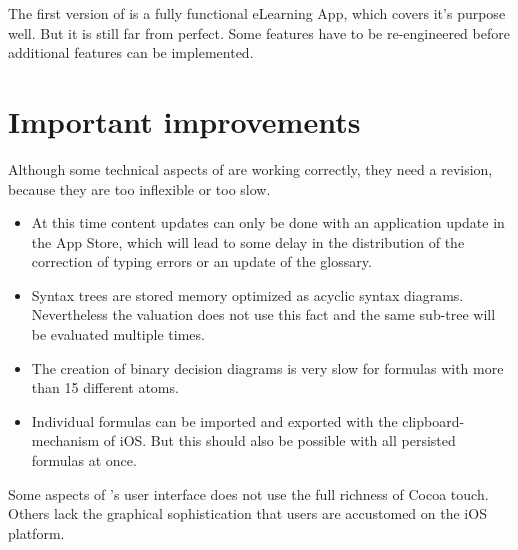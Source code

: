 
The first version of \Nyaya is a fully functional eLearning App, 
which covers it’s purpose well.
But it is still far from perfect.
Some features have to be re-engineered before additional features can be implemented.

\section{Important improvements}

Although some technical aspects of \Nyaya are working correctly, they need a revision, 
because they are too inflexible or too slow.

\begin{itemize}

\item At this time content updates can only be done with an application update in the App Store,
which will lead to some delay in the distribution of the correction of typing errors or an update of the glossary.

\item Syntax trees are stored memory optimized as acyclic syntax diagrams. 
Nevertheless the valuation does not use this fact and the same sub-tree will be evaluated multiple times.

\item The creation of binary decision diagrams is very slow for formulas with more than 15 different atoms.

\item Individual formulas can be imported and exported with the clipboard-mechanism of iOS. 
But this should also be possible with all persisted formulas at once. 


\end{itemize}

Some aspects of \Nyaya’s user interface does not use the full richness of Cocoa touch. 
Others lack the graphical sophistication that users are accustomed on the iOS platform.

